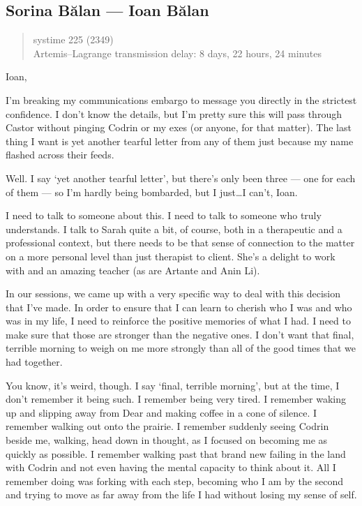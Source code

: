 \hypertarget{sorina-bux103lan-ioan-bux103lan}{%
\subsection{Sorina Bălan — Ioan Bălan}\label{sorina-bux103lan-ioan-bux103lan}}

\begin{quote}
systime 225 (2349)\\
Artemis--Lagrange transmission delay: 8 days, 22 hours, 24 minutes
\end{quote}

Ioan,

I'm breaking my communications embargo to message you directly in the strictest confidence. I don't know the details, but I'm pretty sure this will pass through Castor without pinging Codrin or my exes (or anyone, for that matter). The last thing I want is yet another tearful letter from any of them just because my name flashed across their feeds.

Well. I say `yet another tearful letter', but there's only been three — one for each of them — so I'm hardly being bombarded, but I just\ldots I can't, Ioan.

I need to talk to someone about this. I need to talk to someone who truly understands. I talk to Sarah quite a bit, of course, both in a therapeutic and a professional context, but there needs to be that sense of connection to the matter on a more personal level than just therapist to client. She's a delight to work with and an amazing teacher (as are Artante and Anin Li).

In our sessions, we came up with a very specific way to deal with this decision that I've made. In order to ensure that I can learn to cherish who I was and who was in my life, I need to reinforce the positive memories of what I had. I need to make sure that those are stronger than the negative ones. I don't want that final, terrible morning to weigh on me more strongly than all of the good times that we had together.

You know, it's weird, though. I say `final, terrible morning', but at the time, I don't remember it being such. I remember being very tired. I remember waking up and slipping away from Dear and making coffee in a cone of silence. I remember walking out onto the prairie. I remember suddenly seeing Codrin beside me, walking, head down in thought, as I focused on becoming me as quickly as possible. I remember walking past that brand new failing in the land with Codrin and not even having the mental capacity to think about it. All I remember doing was forking with each step, becoming who I am by the second and trying to move as far away from the life I had without losing my sense of self.

